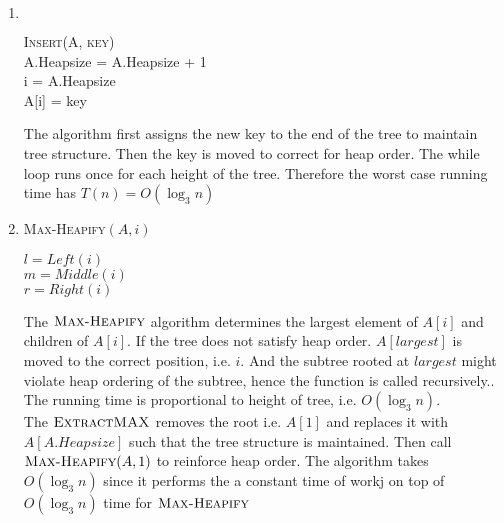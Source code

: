 \documentclass[11pt]{article}
\begin{document}
\begin{enumerate}
  \begin{enumerate}
    \item
    $ $\\

    \begin{algorithm}[H]
      \textsc{Insert(A, key)} \\
      A.Heapsize = A.Heapsize + 1\\
      i = A.Heapsize\\
      A[i] = key\\

    \end{algorithm}
    The algorithm first assigns the new key to the end of the tree to maintain tree structure. Then the key is moved to correct for heap order. The while loop runs once for each height of the tree. Therefore the worst case running time has $T(n) = O(\log_3 n)$
    \item
    \begin{algorithm}[H]
      \textsc{Max-Heapify}$(A,i)$ \\

      $l = Left(i)$\\
      $m = Middle(i)$\\
      $r = Right(i)$\\

    \end{algorithm}
    The $\textsc{Max-Heapify}$ algorithm determines the largest element of $A[i]$ and children of $A[i]$. If the tree does not satisfy heap order. $A[largest]$ is moved to the correct position, i.e. $i$. And the subtree rooted at $largest$ might violate heap ordering of the subtree, hence the function is called recursively.. The running time is proportional to height of tree, i.e. $O(\log_3 n)$. \\
    The $\textsc{ExtractMAX}$ removes the root i.e. $A[1]$ and replaces it with $A[A.Heapsize]$ such that the tree structure is maintained. Then call $\textsc{Max-Heapify}(A, 1)$ to reinforce heap order. The algorithm takes $O(\log_3 n)$ since it performs the a constant time of workj on top of $O(\log_3 n)$ time for $\textsc{Max-Heapify}$


\end{enumerate}
\end{enumerate}
\end{document}
